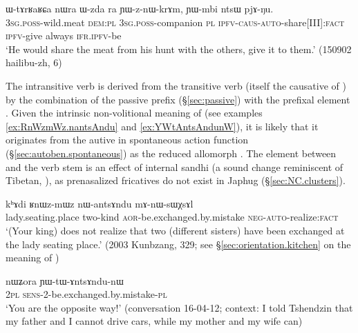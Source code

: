 \begin{exe}
\ex \label{ex:YWznWkrAm}
\gll ɯ-tɤrʁaʁɕa nɯra ɯ-zda ra ɲɯ-z-nɯ-krɤm, ɲɯ-mbi ntsɯ pjɤ-ŋu. \\
\textsc{3sg}.\textsc{poss}-wild.meat \textsc{dem}:\textsc{pl} \textsc{3sg}.\textsc{poss}-companion \textsc{pl} \textsc{ipfv}-\textsc{caus}-\textsc{auto}-share[III]:\textsc{fact} \textsc{ipfv}-give always \textsc{ifr}.\textsc{ipfv}-be \\
\glt `He would share the meat from his hunt with the others, give it to them.' (150902 hailibu-zh, 6)
\end{exe}
The intransitive verb  is derived from the transitive verb  (itself the causative of ) by the combination of the passive  prefix (§\ref{sec:passive}) with the prefixal element . Given the intrinsic non-volitional meaning of  (see examples \ref{ex:RnWzmWz.nantsAndu} and \ref{ex:YWtAntsAndunW}), it is likely that it originates from the autive in spontaneous action function (§\ref{sec:autoben.spontaneous}) as the reduced allomorph . The  element between  and the verb stem  is an effect of internal sandhi  \fl{}  (a sound change reminiscent of Tibetan, \citealt{lifk33}), as prenasalized fricatives do not exist in Japhug (§\ref{sec:NC.clusters}).


\begin{exe}
\ex \label{ex:RnWzmWz.nantsAndu}
\gll kʰɤdi ʁnɯz-mɯz nɯ-antsɤndu mɤ-nɯ-sɯχsɤl \\
lady.seating.place two-kind \textsc{aor}-be.exchanged.by.mistake \textsc{neg}-\textsc{auto}-realize:\textsc{fact} \\
\glt `(Your king) does not realize that two (different sisters) have been exchanged at the lady seating place.' (2003 Kunbzang, 329; see §\ref{sec:orientation.kitchen} on the meaning of )
\end{exe}

\begin{exe}
\ex \label{ex:YWtAntsAndunW}
\gll nɯʑora ɲɯ-tɯ-ɤntsɤndu-nɯ \\
\textsc{2pl} \textsc{sens}-2-be.exchanged.by.mistake-\textsc{pl} \\
\glt `You are the opposite way!' (conversation 16-04-12; context: I told Tshendzin that my father and I cannot drive cars, while my mother and my wife can)
\end{exe}

